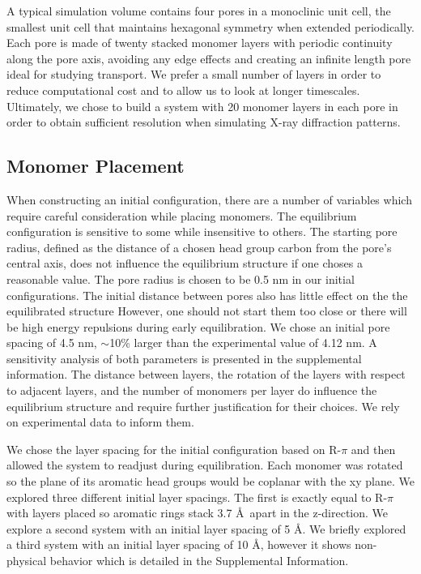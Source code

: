 \documentclass[journal=jpcbfk,manusciprt=article]{achemso}
\begin{document}
  A typical simulation volume contains four pores in a monoclinic unit cell,
  the smallest unit cell that maintains hexagonal symmetry when extended
  periodically. Each pore is made of twenty stacked monomer layers with periodic
  continuity along the pore axis, avoiding any edge effects and creating an
  infinite length pore ideal for studying transport. We prefer a small number of layers
  in order to reduce computational cost and to allow us to look at
  longer timescales. Ultimately, we chose to build a system with 20 monomer
  layers in each pore in order to obtain sufficient resolution when simulating
  X-ray diffraction patterns. %

\subsection{Monomer Placement} 

  When constructing an initial configuration, there are a number of variables
  which require careful consideration while placing monomers. The equilibrium
  configuration is sensitive to some while insensitive to others. The starting
  pore radius, defined as the distance of a chosen head group carbon from the
  pore's central axis, does not influence the equilibrium structure if one choses
  a reasonable value. The pore radius is chosen to be 0.5 nm in our initial
  configurations. The initial distance between pores also has little effect on
  the the equilibrated structure However, one should not start them too close or
  there will be high energy repulsions during early equilibration. We chose an
  initial pore spacing of 4.5 nm, $\sim$10\% larger than the experimental value
  of 4.12 nm.  A sensitivity analysis of both parameters is presented in
  the supplemental information.  The distance between layers, the rotation of the
  layers with respect to adjacent layers, and the number of monomers per layer do
  influence the equilibrium structure and require further justification for their
  choices. We rely on experimental data to inform them. 

  We chose the layer spacing for the initial configuration based on R-$\pi$ and
  then allowed the system to readjust during equilibration. Each monomer was
  rotated so the plane of its aromatic head groups would be coplanar with the xy
  plane. We explored three different initial layer spacings. The first is exactly
  equal to R-$\pi$ with layers placed so aromatic rings stack 3.7 \AA~apart in
  the z-direction. We explore a second system with an initial layer spacing of 5
  \AA. We briefly explored a third system with an initial layer spacing of 10
  \AA, however it shows non-physical behavior which is detailed in the 
  Supplemental Information. 
\end{document}
